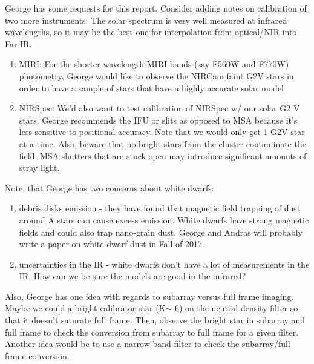 \documentclass{aastex6}
\begin{document}
George has some requests for this report.
Consider adding notes on calibration of two more instruments.
The solar spectrum is very well measured at infrared wavelengths, so it may be the best one for interpolation from optical/NIR into Far IR.
\begin{enumerate}
	\item MIRI: For the shorter wavelength MIRI bands (say F560W and F770W) photometry, George would like to observe the NIRCam faint G2V stars in order to have a sample of stars that have a highly accurate solar model
	\item NIRSpec: We'd also want to test calibration of NIRSpec w/ our solar G2 V stars.
George recommends the IFU or slits as opposed to MSA because it's less sensitive to positional accuracy.
Note that we would only get 1 G2V star at a time.
Also, beware that no bright stars from the cluster contaminate the field. MSA shutters that are stuck open may introduce significant amounts of stray light.
\end{enumerate}
Note, that George has two concerns about white dwarfs:
\begin{enumerate}
	\item debris disks emission - they have found that magnetic field trapping of dust around A stars can cause excess emission.
White dwarfs have strong magnetic fields and could also trap nano-grain dust.
George and Andras will probably write a paper on white dwarf dust in Fall of 2017.
	\item uncertainties in the IR - white dwarfs don't have a lot of measurements in the IR.
How can we be sure the models are good in the infrared?
\end{enumerate}
Also, George has one idea with regards to subarray versus full frame imaging.
Maybe we could a bright calibrator star (K$\sim$ 6) on the neutral density filter so that it doesn't saturate full frame.
Then, observe the bright star in subarray and full frame to check the conversion from subarray to full frame for a given filter.
Another idea would be to use a narrow-band filter to check the subarray/full frame conversion.

\end{document}
